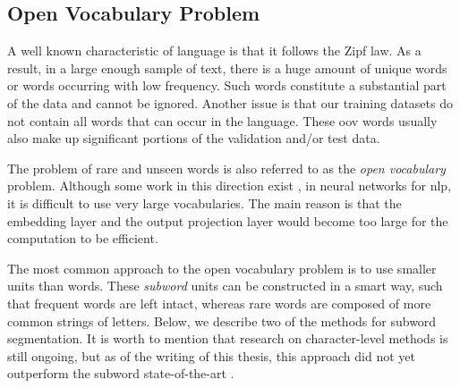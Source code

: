 \subsection{Open Vocabulary Problem}

A well known characteristic of language is that it follows the Zipf law. As a
result, in a large enough sample of text, there is a huge amount of unique words
or words occurring with low frequency. Such words constitute a substantial part
of the data and cannot be ignored.  Another issue is that our training datasets
do not contain all words that can occur in the language. These \gls{oov} words
usually also make up significant portions of the validation and/or test data.

The problem of rare and unseen words is also referred to as the \emph{open
vocabulary} problem. Although some work in this direction exist
\citep{jean2015using}, in neural networks for \gls{nlp}, it is difficult to use
very large vocabularies. The main reason is that the embedding layer and the
output projection layer would become too large for the computation to be
efficient.

The most common approach to the open vocabulary problem is to use smaller units
than words. These \emph{subword} units can be constructed in a smart way, such
that frequent words are left intact, whereas rare words are composed of more
common strings of letters. Below, we describe two of the methods for subword
segmentation. It is worth to mention that research on character-level methods is
still ongoing, but as of the writing of this thesis, this approach did not yet
outperform the subword state-of-the-art
\citep{chung-etal-2016-character,lee-etal-2017-fully,gao-etal-2020-character}.
%
%
%
%
%
%
%
%
%
%
%
%
%
%
%
%
%
%
%
%
%
%
%
%


